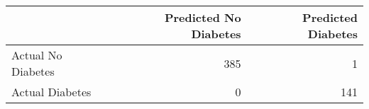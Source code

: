 \begin{tabular}{lrr}
\toprule
 & Predicted No Diabetes & Predicted Diabetes \\
\midrule
Actual No Diabetes & 385 & 1 \\
Actual Diabetes & 0 & 141 \\
\bottomrule
\end{tabular}
